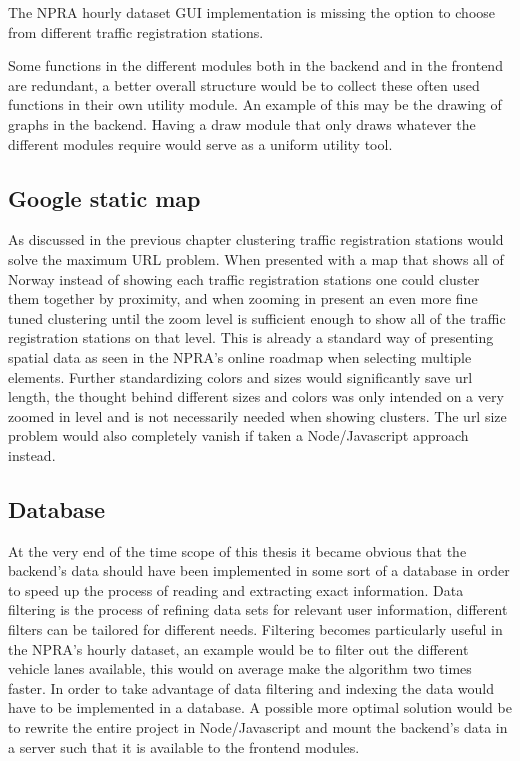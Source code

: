 The NPRA hourly dataset GUI implementation is missing the option to choose from different traffic registration stations.

Some functions in the different modules both in the backend and in the frontend are redundant, a better overall structure would be to collect these often used functions in their own utility module. An example of this may be the drawing of graphs in the backend. Having a draw module that only draws whatever the different modules require would serve as a uniform utility tool.

\subsection{Google static map}
As discussed in the previous chapter clustering traffic registration stations would solve the maximum URL problem. When presented with a map that shows all of Norway instead of showing each traffic registration stations one could cluster them together by proximity, and when zooming in present an even more fine tuned clustering until the zoom level is sufficient enough to show all of the traffic registration stations on that level. This is already a standard way of presenting spatial data as seen in the NPRA's online roadmap\cite{vegkart} when selecting multiple elements. Further standardizing colors and sizes would significantly save url length, the thought behind different sizes and colors was only intended on a very zoomed in level and is not necessarily needed when showing clusters. The url size problem would also completely vanish if taken a Node/Javascript approach instead. 

\subsection{Database}
At the very end of the time scope of this thesis it became obvious that the backend's data should have been implemented in some sort of a database in order to speed up the process of reading and extracting exact information. Data filtering is the process of refining data sets for relevant user information, different filters can be tailored for different needs. Filtering becomes particularly useful in the NPRA's hourly dataset, an example would be to filter out the different vehicle lanes available, this would on average make the algorithm two times faster. In order to take advantage of data filtering and indexing the data would have to be implemented in a database. A possible more optimal solution would be to rewrite the entire project in Node/Javascript and mount the backend's data in a server such that it is available to the frontend modules.




